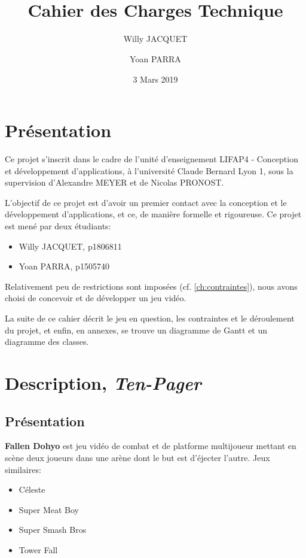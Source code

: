 \documentclass[french]{report}
\title{\gamename\\Cahier des Charges Technique}
\author{Willy JACQUET \and Yoan PARRA }
\date{3 Mars 2019}
\newcommand{\gamename}{\textbf{Fallen Dohyo} }
\begin{document}
\maketitle

\tableofcontents

\newpage

\chapter{Présentation}

    Ce projet s'inscrit dans le cadre de l'unité d'enseignement LIFAP4
    - Conception et développement d'applications,
    à l'université Claude Bernard Lyon 1, 
    sous la supervision d'Alexandre MEYER et de Nicolas PRONOST.

    L'objectif de ce projet est d'avoir un premier contact
    avec la conception et le développement d'applications,
    et ce, de manière formelle et rigoureuse.
    \linebreak
    Ce projet est mené par deux étudiants:
    \begin{itemize}
        \item Willy JACQUET, p1806811
        \item Yoan PARRA, p1505740
    \end{itemize}

    Relativement peu de restrictions sont imposées (cf. \ref{ch:contraintes}),
    nous avons choisi de concevoir et de développer un jeu vidéo.

    La suite de ce cahier décrit le jeu en question, les contraintes et le déroulement
    du projet, et enfin, en annexes, se trouve un diagramme de Gantt
    et un diagramme des classes.
    

\chapter{Description, \textit{Ten-Pager}}

\section{Présentation}

    \gamename est jeu vidéo de combat et de platforme multijoueur
    mettant en scène deux joueurs dans une arène dont le but est d'éjecter
    l'autre.
    \linebreak
    Jeux similaires:
    \begin{itemize}[label=$\bullet$]
        \item Céleste
        \item Super Meat Boy
        \item Super Smash Bros
        \item Tower Fall
    \end{itemize}
\end{document}
